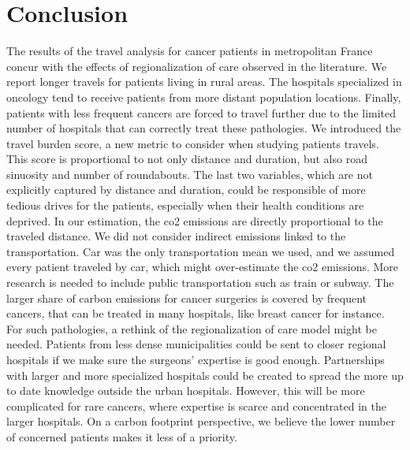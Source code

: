 \section{Conclusion}

The results of the travel analysis for cancer patients in metropolitan France
concur with the effects of regionalization of care observed in the literature.
We report longer travels for patients living in rural areas. The hospitals
specialized in oncology tend to receive patients from more distant population
locations. Finally, patients with less frequent cancers are forced to travel
further due to the limited number of hospitals that can correctly treat these
pathologies. We introduced the travel burden score, a new metric to consider
when studying patients travels. This score is proportional to not only distance
and duration, but also road sinuosity and number of roundabouts. The last two
variables, which are not explicitly captured by distance and duration, could be
responsible of more tedious drives for the patients, especially when their
health conditions are deprived. In our estimation, the \ac{co2} emissions are
directly proportional to the traveled distance. We did not consider indirect
emissions linked to the transportation. Car was the only transportation mean we
used, and we assumed every patient traveled by car, which might over-estimate
the \ac{co2} emissions. More research is needed to include public transportation
such as train or subway. The larger share of carbon emissions for cancer
surgeries is covered by frequent cancers, that can be treated in many hospitals,
like breast cancer for instance. For such pathologies, a rethink of the
regionalization of care model might be needed. Patients from less dense
municipalities could be sent to closer regional hospitals if we make sure the
surgeons' expertise is good enough. Partnerships with larger and more
specialized hospitals could be created to spread the more up to date knowledge
outside the urban hospitals. However, this will be more complicated for rare
cancers, where expertise is scarce and concentrated in the larger hospitals. On
a carbon footprint perspective, we believe the lower number of concerned
patients makes it less of a priority.

